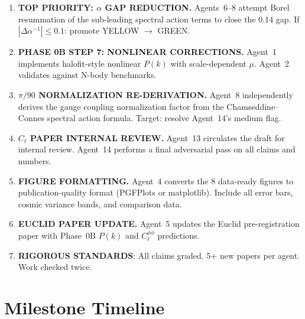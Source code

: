 \documentclass[11pt,a4paper]{article}
\begin{document}
\begin{enumerate}
\item \textbf{TOP PRIORITY: $\alpha$ GAP REDUCTION.} Agents~6--8 attempt Borel resummation of the sub-leading spectral action terms to close the 0.14 gap. If $|\Delta\alpha^{-1}| \leq 0.1$: promote YELLOW $\to$ GREEN.

\item \textbf{PHASE 0B STEP 7: NONLINEAR CORRECTIONS.} Agent~1 implements halofit-style nonlinear $P(k)$ with scale-dependent $\mu$. Agent~2 validates against N-body benchmarks.

\item \textbf{$\pi/90$ NORMALIZATION RE-DERIVATION.} Agent~8 independently derives the gauge coupling normalization factor from the Chamseddine--Connes spectral action formula. Target: resolve Agent~14's medium flag.

\item \textbf{$C_\ell$ PAPER INTERNAL REVIEW.} Agent~13 circulates the draft for internal review. Agent~14 performs a final adversarial pass on all claims and numbers.

\item \textbf{FIGURE FORMATTING.} Agent~4 converts the 8 data-ready figures to publication-quality format (PGFPlots or matplotlib). Include all error bars, cosmic variance bands, and comparison data.

\item \textbf{EUCLID PAPER UPDATE.} Agent~5 updates the Euclid pre-registration paper with Phase~0B $P(k)$ and $C_\ell^{\phi\phi}$ predictions.

\item \textbf{RIGOROUS STANDARDS}: All claims graded. 5+ new papers per agent. Work checked twice.
\end{enumerate}


\section{Milestone Timeline}
\label{sec:timeline}
\end{document}
